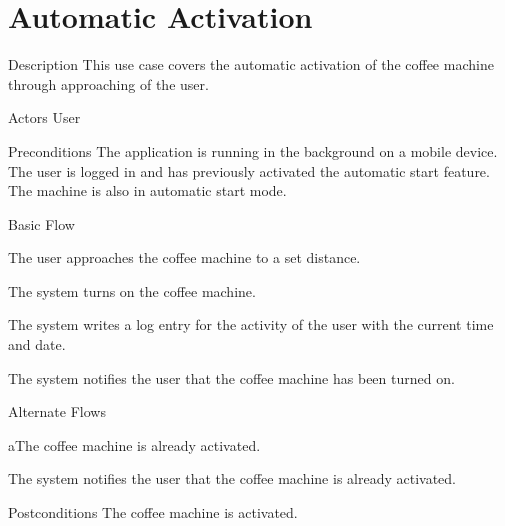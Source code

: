 \section{Automatic Activation}

\begin{cpart}{Description}
This use case covers the automatic activation of the coffee machine through approaching of the user.
\end{cpart}

\begin{cpart}{Actors}
User
\end{cpart}

\begin{cpart}{Preconditions}
The application is running in the background on a mobile device. The user is logged in and has previously activated the automatic start feature. The machine is also in automatic start mode.
\end{cpart}

\begin{cpartList}{Basic Flow}
  \item The user approaches the coffee machine to a set distance.
  \item The system turns on the coffee machine.
  \item The system writes a log entry for the activity of the user with the current time and date.
  \item The system notifies the user that the coffee machine has been turned on.
\end{cpartList}

\begin{cpartList}{Alternate Flows}
  \begin{innerList}{2}{a}{The coffee machine is already activated.}
    \item The system notifies the user that the coffee machine is already activated.
  \end{innerList}
\end{cpartList}

\begin{cpart}{Postconditions}
The coffee machine is activated.
\end{cpart}

